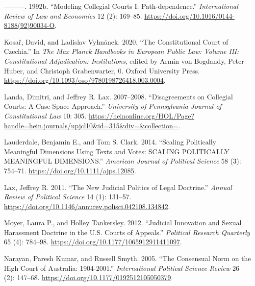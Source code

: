 \documentclass[
  11pt,
]{article}
\newlength{\cslhangindent}
\newenvironment{CSLReferences}[2] %
 {%
  \setlength{\parindent}{0pt}
  \ifodd #1 \everypar{\setlength{\hangindent}{\cslhangindent}}\ignorespaces\fi
  \ifnum #2 > 0
  \setlength{\parskip}{#2\baselineskip}
  \fi
 }%
 {}
\begin{document}
\begin{CSLReferences}{1}{0}
\leavevmode{}%
---------. 1992b. {``Modeling Collegial Courts {I}:
{Path-dependence}.''} \emph{International Review of Law and Economics}
12 (2): 169--85. \url{https://doi.org/10.1016/0144-8188(92)90034-O}.

\leavevmode{}%
Kosař, David, and Ladislav Vyhnánek. 2020. {``The {Constitutional Court}
of {Czechia}.''} In \emph{The {Max Planck Handbooks} in {European Public
Law}: {Volume III}: {Constitutional Adjudication}: {Institutions}},
edited by Armin von Bogdandy, Peter Huber, and Christoph Grabenwarter,
0. {Oxford University Press}.
\url{https://doi.org/10.1093/oso/9780198726418.003.0004}.

\leavevmode{}%
Landa, Dimitri, and Jeffrey R. Lax. 2007--2008. {``Disagreements on
{Collegial Courts}: {A Case-Space Approach}.''} \emph{University of
Pennsylvania Journal of Constitutional Law} 10: 305.
\url{https://heinonline.org/HOL/Page?handle=hein.journals/upjcl10&id=315&div=&collection=}.

\leavevmode{}%
Lauderdale, Benjamin E., and Tom S. Clark. 2014. {``Scaling {Politically
Meaningful Dimensions Using Texts} and {Votes}: {SCALING POLITICALLY
MEANINGFUL DIMENSIONS}.''} \emph{American Journal of Political Science}
58 (3): 754--71. \url{https://doi.org/10.1111/ajps.12085}.

\leavevmode{}%
Lax, Jeffrey R. 2011. {``The {New Judicial Politics} of {Legal
Doctrine}.''} \emph{Annual Review of Political Science} 14 (1): 131--57.
\url{https://doi.org/10.1146/annurev.polisci.042108.134842}.

\leavevmode{}%
Moyer, Laura P., and Holley Tankersley. 2012. {``Judicial {Innovation}
and {Sexual Harassment Doctrine} in the {U}.{S}. {Courts} of
{Appeals}.''} \emph{Political Research Quarterly} 65 (4): 784--98.
\url{https://doi.org/10.1177/1065912911411097}.

\leavevmode{}%
Narayan, Paresh Kumar, and Russell Smyth. 2005. {``The {Consensual Norm}
on the {High Court} of {Australia}: 1904-2001.''} \emph{International
Political Science Review} 26 (2): 147--68.
\url{https://doi.org/10.1177/0192512105050379}.


\end{CSLReferences}
\end{document}
